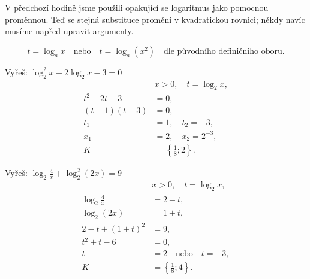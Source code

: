 \documentclass[11pt,a4paper]{article}
\begin{document}
V předchozí hodině jsme použili opakující se logaritmus jako pomocnou proměnnou. Teď se stejná substituce promění v kvadratickou rovnici; někdy navíc musíme napřed upravit argumenty.

\[
t=\log_a x\quad\text{nebo}\quad t=\log_a(x^2)\quad\text{dle původního definičního oboru}.
\]


\begin{prikladReseniBox}[title={Příklad 1}]
Vyřeš: $\displaystyle \log_2^2x+2\log_2 x-3=0$
\tcblower
\[
\begin{aligned}
&x>0,\quad t=\log_2 x,\\
t^2+2t-3&=0,\\
(t-1)(t+3)&=0,\\
t_1&=1,\quad t_2=-3,\\
x_1&=2,\quad x_2=2^{-3},\\
K&=\left\{\frac18;2\right\}.
\end{aligned}
\]
\end{prikladReseniBox}
\begin{prikladReseniBox}[title={Příklad 2}]
Vyřeš: $\displaystyle \log_2\frac4x+\log_2^2(2x)=9$
\tcblower
\[
\begin{aligned}
&x>0,\quad t=\log_2 x,\\
\log_2\frac4x&=2-t,\\
\log_2(2x)&=1+t,\\
2-t+(1+t)^2&=9,\\
t^2+t-6&=0,\\
t&=2\quad\text{nebo}\quad t=-3,\\
K&=\left\{\frac18;4\right\}.
\end{aligned}
\]
\end{prikladReseniBox}
\end{document}
